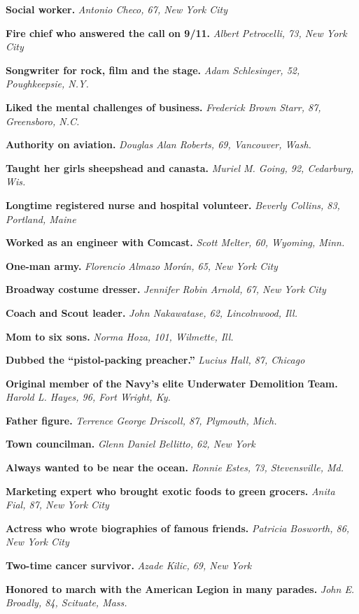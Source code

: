 \textbf{Social worker.} \emph{Antonio Checo, 67, New York City}

\textbf{Fire chief who answered the call on 9/11.} \emph{Albert
Petrocelli, 73, New York City}

\textbf{Songwriter for rock, film and the stage.} \emph{Adam
Schlesinger, 52, Poughkeepsie, N.Y.}

\textbf{Liked the mental challenges of business.} \emph{Frederick Brown
Starr, 87, Greensboro, N.C.}

\textbf{Authority on aviation.} \emph{Douglas Alan Roberts, 69,
Vancouver, Wash.}

\textbf{Taught her girls sheepshead and canasta.} \emph{Muriel M. Going,
92, Cedarburg, Wis.}

\textbf{Longtime registered nurse and hospital volunteer.} \emph{Beverly
Collins, 83, Portland, Maine}

\textbf{Worked as an engineer with Comcast.} \emph{Scott Melter, 60,
Wyoming, Minn.}

\textbf{One-man army.} \emph{Florencio Almazo Morán, 65, New York City}

\textbf{Broadway costume dresser.} \emph{Jennifer Robin Arnold, 67, New
York City}

\textbf{Coach and Scout leader.} \emph{John Nakawatase, 62, Lincolnwood,
Ill.}

\textbf{Mom to six sons.} \emph{Norma Hoza, 101, Wilmette, Ill.}

\textbf{Dubbed the ``pistol-packing preacher.''} \emph{Lucius Hall, 87,
Chicago}

\textbf{Original member of the Navy's elite Underwater Demolition Team.}
\emph{Harold L. Hayes, 96, Fort Wright, Ky.}

\textbf{Father figure.} \emph{Terrence George Driscoll, 87, Plymouth,
Mich.}

\textbf{Town councilman.} \emph{Glenn Daniel Bellitto, 62, New York}

\textbf{Always wanted to be near the ocean.} \emph{Ronnie Estes, 73,
Stevensville, Md.}

\textbf{Marketing expert who brought exotic foods to green grocers.}
\emph{Anita Fial, 87, New York City}

\textbf{Actress who wrote biographies of famous friends.} \emph{Patricia
Bosworth, 86, New York City}

\textbf{Two-time cancer survivor.} \emph{Azade Kilic, 69, New York}

\textbf{Honored to march with the American Legion in many parades.}
\emph{John E. Broadly, 84, Scituate, Mass.}

